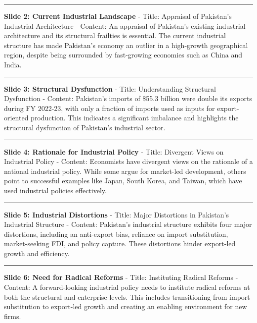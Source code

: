 \documentclass[
  letterpaper,
  DIV=11,
  numbers=noendperiod]{scrartcl}
\begin{document}
\begin{center}\rule{0.5\linewidth}{0.5pt}\end{center}

\textbf{Slide 2: Current Industrial Landscape} - Title: Appraisal of
Pakistan's Industrial Architecture - Content: An appraisal of Pakistan's
existing industrial architecture and its structural frailties is
essential. The current industrial structure has made Pakistan's economy
an outlier in a high-growth geographical region, despite being
surrounded by fast-growing economies such as China and India.

\begin{center}\rule{0.5\linewidth}{0.5pt}\end{center}

\textbf{Slide 3: Structural Dysfunction} - Title: Understanding
Structural Dysfunction - Content: Pakistan's imports of \$55.3 billion
were double its exports during FY 2022-23, with only a fraction of
imports used as inputs for export-oriented production. This indicates a
significant imbalance and highlights the structural dysfunction of
Pakistan's industrial sector.

\begin{center}\rule{0.5\linewidth}{0.5pt}\end{center}

\textbf{Slide 4: Rationale for Industrial Policy} - Title: Divergent
Views on Industrial Policy - Content: Economists have divergent views on
the rationale of a national industrial policy. While some argue for
market-led development, others point to successful examples like Japan,
South Korea, and Taiwan, which have used industrial policies
effectively.

\begin{center}\rule{0.5\linewidth}{0.5pt}\end{center}

\textbf{Slide 5: Industrial Distortions} - Title: Major Distortions in
Pakistan's Industrial Structure - Content: Pakistan's industrial
structure exhibits four major distortions, including an anti-export
bias, reliance on import substitution, market-seeking FDI, and policy
capture. These distortions hinder export-led growth and efficiency.

\begin{center}\rule{0.5\linewidth}{0.5pt}\end{center}

\textbf{Slide 6: Need for Radical Reforms} - Title: Instituting Radical
Reforms - Content: A forward-looking industrial policy needs to
institute radical reforms at both the structural and enterprise levels.
This includes transitioning from import substitution to export-led
growth and creating an enabling environment for new firms.
\end{document}
